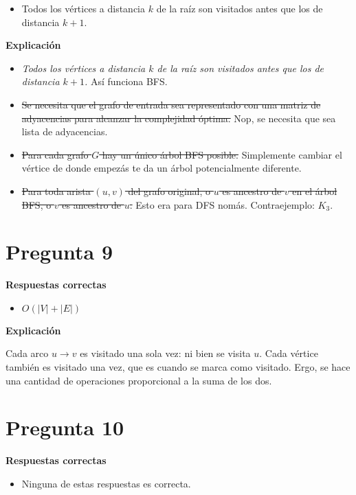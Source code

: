 \documentclass{article}
\begin{document}
\begin{itemize}
    \item Todos los vértices a distancia $k$ de la raíz son visitados antes que los de distancia $k + 1$.
\end{itemize}

\textbf{Explicación}

\begin{itemize}
    \item \textit{Todos los vértices a distancia $k$ de la raíz son visitados antes que los de distancia $k + 1$.} Así funciona BFS.
    \item \sout{Se necesita que el grafo de entrada sea representado con una matriz de adyacencias para alcanzar la complejidad óptima.} Nop, se necesita que sea lista de adyacencias.
    \item \sout{Para cada grafo $G$ hay un único árbol BFS posible.} Simplemente cambiar el vértice de donde empezás te da un árbol potencialmente diferente.
    \item \sout{Para toda arista $(u,v)$ del grafo original, o $u$ es ancestro de $v$ en el árbol BFS, o $v$ es ancestro de $u$.} Esto era para DFS nomás. Contraejemplo: $K_3$. 
\end{itemize}

\section*{Pregunta 9}
\textbf{Respuestas correctas}

\begin{itemize}
    \item $O(|V| + |E|)$
\end{itemize}

\textbf{Explicación}

Cada arco $u \rightarrow v$ es visitado una sola vez: ni bien se visita $u$. Cada vértice también es visitado una vez, que es cuando se marca como visitado. Ergo, se hace una cantidad de operaciones proporcional a la suma de los dos.

\section*{Pregunta 10}
\textbf{Respuestas correctas}

\begin{itemize}
    \item Ninguna de estas respuestas es correcta.
\end{itemize}
\end{document}
